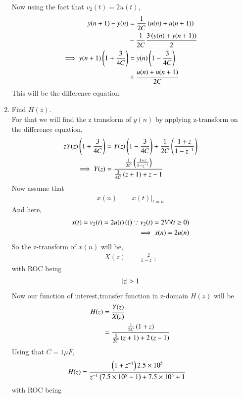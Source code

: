 \documentclass[journal,12pt,twocolumn]{IEEEtran}
\renewcommand\thesection{\arabic{section}}
\begin{document}
\begin{enumerate}[label=\arabic*.,ref=\thesection.\theenumi]
      Now using the fact that $v_2(t) = 2u(t)$,
       \begin{align}
        y(n+1) - y(n) &= \frac{1}{2C}\left(u(n) + u(n+1)\right) \nonumber \\ & -\frac{1}{2C}\frac{3\left(y(n) + y(n+1)\right)}{2} \\
	\implies y(n+1)\left(1 + \frac{3}{4C}\right) &= y(n)\left(1  - \frac{3}{4C}\right) \\ \nonumber &+ \frac{u(n) + u(n+1)}{2C}\label{eq:y_diff}
       \end{align}
       This will be the difference equation.
	\item Find $H(z)$.\\
	 For that we will find the z transform of $y(n)$ by applying z-transform on the difference equation,
	  \begin{align}
		  zY(z)\left(1 + \frac{3}{4C}\right) &= Y(z)\left(1 - \frac{3}{4C}\right) + \frac{1}{2C}\left(\frac{1 + z}{1 - z^{-1}}\right)\\
		 \implies Y(z) &= \frac{\frac{1}{2C}\left(\frac{1 + z}{1 - z^{-1}}\right)}{\frac{3}{4C}\left(z+1\right) + z-1}
	  \end{align}
	  Now assume that
	    \begin{align}
		    x(n) &= x(t)\vert_{t=n}
	    \end{align}
	    And here, 
	    \begin{align}
	    x(t) = v_2(t) = 2u(t)\left((\right)\because v_2(t) = 2V \forall t \geq 0)\\
	    \implies x(n) = 2u(n)
	    \end{align}
	     So the z-transform of $x(n)$ will be,
	      \begin{align}
		X(z) &= \frac{2}{1 - z^{-1}}
	      \end{align}
	      with ROC being
	       \begin{align}
		       \left\vert z\right\vert > 1
		\end{align}
	 Now our function of interest,transfer function in z-domain $H(z)$ will be
	  \begin{align}
		  H(z) &= \frac{Y(z)}{X(z)} \\
		       &= \frac{\frac{1}{2C}\left(1 +z\right)}{\frac{3}{2C}\left(z + 1\right) + 2\left(z - 1\right)} 
	  \end{align}
            Using that $C = 1 \mu F$,
	     \begin{align}
		     H(z) &= \frac{\left(1 + z^{-1}\right)2.5 \times 10^5}{z^{-1}\left(7.5 \times 10^5 - 1\right) + 7.5\times 10^5 + 1}
	     \end{align}
	     with ROC being
	      \begin{align}

\end{align}
\end{enumerate}
\end{document}
